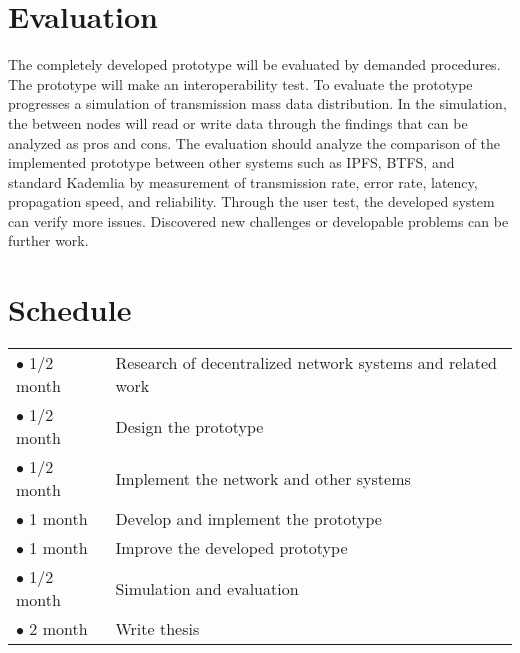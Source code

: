 \documentclass{article}
\begin{document}
\section{Evaluation}
The completely developed prototype will be evaluated by demanded procedures. The prototype will make an interoperability test. To evaluate the prototype progresses a simulation of transmission mass data distribution. In the simulation, the between nodes will read or write data through the findings that can be analyzed as pros and cons. The evaluation should analyze the comparison of the implemented prototype between other systems such as IPFS, BTFS, and standard Kademlia by measurement of transmission rate, error rate, latency, propagation speed, and reliability. Through the user test, the developed system can verify more issues. Discovered new challenges or developable problems can be further work.

\section{Schedule}

\begin{table} [h]
	\centering
	\begin{tabular}{ p{2cm} p{13cm} }
		$\bullet$ 1/2 month & Research of decentralized network systems and related work \\
		$\bullet$ 1/2 month & Design the prototype\\
		$\bullet$ 1/2 month & Implement the network and other systems \\
		$\bullet$ 1 month & Develop and implement the prototype\\
		$\bullet$ 1 month & Improve the developed prototype\\
		$\bullet$ 1/2 month & Simulation and evaluation \\
		$\bullet$ 2 month & Write thesis \\
	\end{tabular}
\end{table}

\newpage



\end{document}
